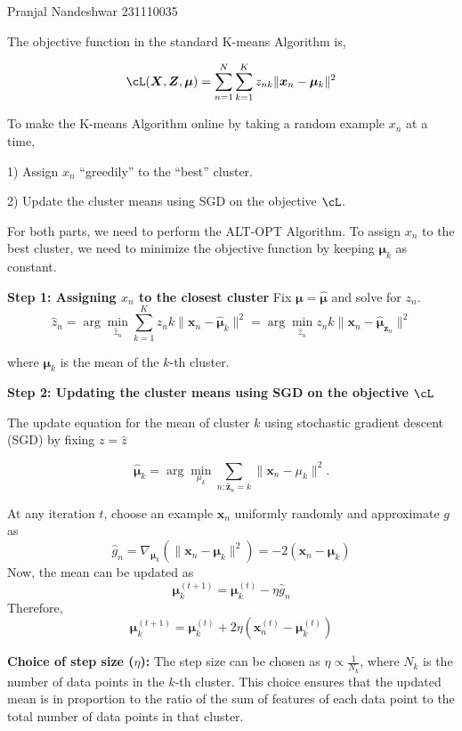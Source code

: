 \documentclass[a4paper,11pt]{article}
\begin{document}
{Pranjal Nandeshwar}   %
{231110035}	%

\begin{mlsolution}

The objective function in the standard K-means Algorithm is,

\begin{equation}
	\cL(\bm{X}, \bm{Z}, \boldsymbol{\mu}) = \sum_{n=1}^N \sum_{k=1}^K z_{nk} \lVert \bm{x}_n - \bm{\mu}_k \rVert^2
\end{equation}

To make the K-means Algorithm online by taking a random example \(x_n\) at a time,

1) Assign \(x_n\) “greedily” to the “best” cluster.

2) Update the cluster means using SGD on the objective \(\cL\).

For both parts, we need to perform the ALT-OPT Algorithm. To assign \(x_n\) to the best cluster, we need to minimize the objective function by keeping \(\bm{\mu}_k\) as constant.

\textbf{Step 1: Assigning \(x_n\) to the closest cluster}
Fix \(\boldsymbol{\mu} = \hat{\boldsymbol{\mu}}\) and solve for \(z_n\).
\begin{equation}
	\hat{z}_n = \arg\min_{\hat{z}_n} \sum_{k=1}^{K} z_nk \|\mathbf{x}_n - \hat{\boldsymbol{\mu}}_k\|^2 = \arg\min_{\hat{z}_n} z_nk \|\mathbf{x}_n - \hat{\boldsymbol{\mu}}_{\bm{z}_n}\|^2	
\end{equation}

where \(\bm{\mu}_k\) is the mean of the \(k\)-th cluster.

\textbf{Step 2: Updating the cluster means using SGD on the objective \(\cL\)}

The update equation for the mean of cluster \(k\) using stochastic gradient descent (SGD) by fixing \(z = \hat{z}\)

\begin{equation}
	\hat{\bm{\mu}}_k = \arg \min_{\mu_k} \sum_{n:\hat{\bm{z}}_n=k} \|\mathbf{x}_n - \mu_k\|^2.
\end{equation}

At any iteration \(t\), choose an example \(\mathbf{x}_n\) uniformly randomly and approximate \(g\) as
\[
\hat{g}_n = \nabla_{\boldsymbol{\mu}_k} \left(\|\mathbf{x}_n - \boldsymbol{\mu}_k\|^2\right) = -2(\mathbf{x}_n - \boldsymbol{\mu}_k)
\]
Now, the mean can be updated as
\[
\boldsymbol{\mu}_k^{(t+1)} = \boldsymbol{\mu}_k^{(t)} - \eta \hat{g}_n
\]
Therefore,
\[
\boldsymbol{\mu}_k^{(t+1)} = \boldsymbol{\mu}_k^{(t)} + 2\eta (\mathbf{x}_n^{(t)} - \boldsymbol{\mu}_k^{(t)})
\]

\textbf{Choice of step size (\(\eta\)):}
The step size can be chosen as \(\eta \propto \frac{1}{{N_k}}\), where \( N_k \) is the number of data points in the \( k \)-th cluster. This choice ensures that the updated mean is in proportion to the ratio of the sum of features of each data point to the total number of data points in that cluster.

\end{mlsolution}
\end{document}
